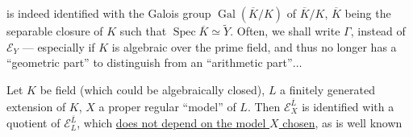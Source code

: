 
is indeed identified with the Galois
group $\operatorname{Gal}(\overline K/K)$ of  $\overline K/K$,
$\overline K$ being the separable closure of $K$ such that
$\operatorname{Spec}\overline K\simeq\widetilde Y$. Often, we shall write
$\Gamma$,  instead of $\mathcal E_Y$ --- especially
if $K$ is algebraic over the prime field,
and thus no longer has a ``geometric
part'' to distinguish from an
``arithmetic part''$\ldots$

Let $K$ be   field (which could
be algebraically closed), $L$ a finitely generated
extension of $K$, $X$ a proper regular ``model''
of $L$. Then
$\mathcal E_X^{\overline L}$ is identified with a quotient of $\mathcal E_L^{\overline L}$,
which \uline{does  not depend on the model
$X$ chosen}, as is well known

